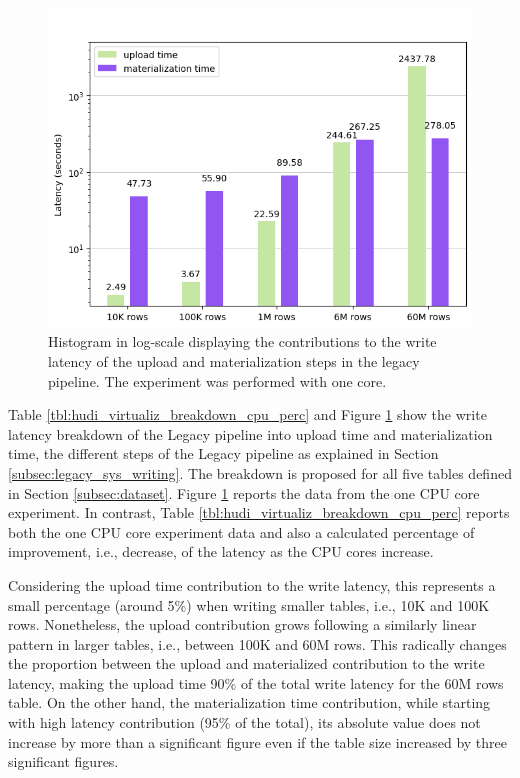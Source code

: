 \begin{figure}
\begin{minipage}[b]{\textwidth}
        \includegraphics[width=\textwidth]{figures/5-results/hudi_virtualiz_1_core.png}
        \caption[Histogram of the write on legacy pipeline - Time breakdown - 1 core]{Histogram in log-scale displaying the contributions to the write latency of the upload and materialization steps in the legacy pipeline. The experiment was performed with one  core.}
        \label{fig:hudi_virtualiz_breakdown}
    \end{minipage}
\end{figure}

Table \ref{tbl:hudi_virtualiz_breakdown_cpu_perc} and Figure \ref{fig:hudi_virtualiz_breakdown} show the write latency breakdown of the Legacy pipeline into upload time and materialization time, the different steps of the Legacy pipeline as explained in Section \ref{subsec:legacy_sys_writing}. The breakdown is proposed for all five tables defined in Section \ref{subsec:dataset}. Figure \ref{fig:hudi_virtualiz_breakdown} reports the data from the one \gls{CPU} core experiment. In contrast, Table \ref{tbl:hudi_virtualiz_breakdown_cpu_perc} reports both the one \gls{CPU} core experiment data and also a calculated percentage of improvement, i.e., decrease, of the latency as the \gls{CPU} cores increase.

Considering the upload time contribution to the write latency, this represents a small percentage (around 5\%) when writing smaller tables, i.e., 10K and 100K rows. Nonetheless, the upload contribution grows following a similarly linear pattern in larger tables, i.e., between 100K and 60M rows. This radically changes the proportion between the upload and materialized contribution to the write latency, making the upload time 90\% of the total write latency for the 60M rows table. On the other hand, the materialization time contribution, while starting with high latency contribution (95\% of the total), its absolute value does not increase by more than a significant figure even if the table size increased by three significant figures.

